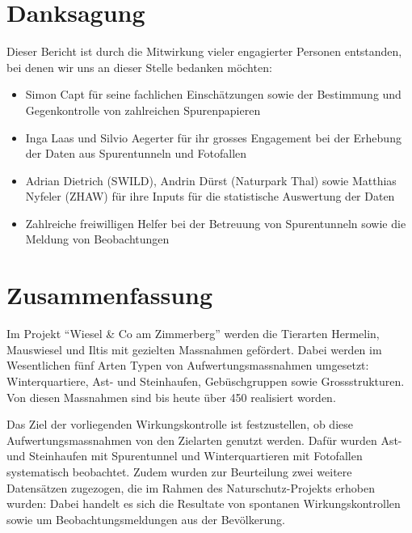 \documentclass[
  oneside]{scrbook}
\providecommand{\tightlist}{%
  \setlength{\itemsep}{0pt}\setlength{\parskip}{0pt}}
\let\oldmaketitle\maketitle
\begin{document}
\let\maketitle\oldmaketitle



{
\setcounter{tocdepth}{1}
\tableofcontents
}
\hypertarget{danksagung}{%
\chapter{Danksagung}\label{danksagung}}

Dieser Bericht ist durch die Mitwirkung vieler engagierter Personen entstanden, bei denen wir uns an dieser Stelle bedanken möchten:

\begin{itemize}
\tightlist
\item
  Simon Capt für seine fachlichen Einschätzungen sowie der Bestimmung und Gegenkontrolle von zahlreichen Spurenpapieren
\item
  Inga Laas und Silvio Aegerter für ihr grosses Engagement bei der Erhebung der Daten aus Spurentunneln und Fotofallen
\item
  Adrian Dietrich (SWILD), Andrin Dürst (Naturpark Thal) sowie Matthias Nyfeler (ZHAW) für ihre Inputs für die statistische Auswertung der Daten
\item
  Zahlreiche freiwilligen Helfer bei der Betreuung von Spurentunneln sowie die Meldung von Beobachtungen
\end{itemize}

\hypertarget{zusammenfassung}{%
\chapter*{Zusammenfassung}\label{zusammenfassung}}

Im Projekt ``Wiesel \& Co am Zimmerberg'' werden die Tierarten Hermelin, Mauswiesel und Iltis mit gezielten Massnahmen gefördert. Dabei werden im Wesentlichen fünf Arten Typen von Aufwertungsmassnahmen umgesetzt: Winterquartiere, Ast- und Steinhaufen, Gebüschgruppen sowie Grossstrukturen. Von diesen Massnahmen sind bis heute über 450 realisiert worden.

Das Ziel der vorliegenden Wirkungskontrolle ist festzustellen, ob diese Aufwertungsmassnahmen von den Zielarten genutzt werden. Dafür wurden Ast- und Steinhaufen mit Spurentunnel und Winterquartieren mit Fotofallen systematisch beobachtet. Zudem wurden zur Beurteilung zwei weitere Datensätzen zugezogen, die im Rahmen des Naturschutz-Projekts erhoben wurden: Dabei handelt es sich die Resultate von spontanen Wirkungskontrollen sowie um Beobachtungsmeldungen aus der Bevölkerung.
\end{document}
